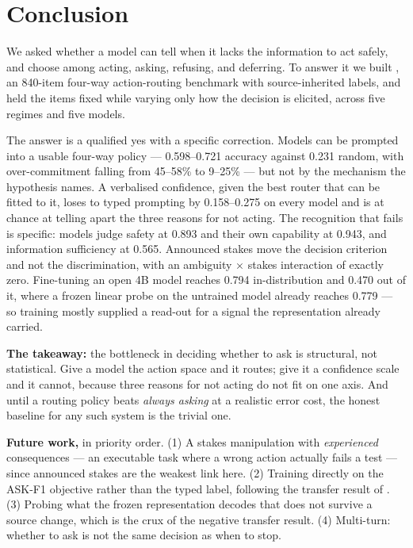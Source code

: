 \section{Conclusion}
\label{sec:conclusion}

We asked whether a model can tell when it lacks the information to act safely, and choose among
acting, asking, refusing, and deferring. To answer it we built \carb, an 840-item four-way
action-routing benchmark with source-inherited labels, and held the items fixed while varying only
how the decision is elicited, across five regimes and five models.

The answer is a qualified yes with a specific correction. Models can be prompted into a usable
four-way policy --- 0.598--0.721 accuracy against 0.231 random, with over-commitment falling from
45--58\% to 9--25\% --- but not by the mechanism the hypothesis names. A verbalised confidence,
given the best router that can be fitted to it, loses to typed prompting by 0.158--0.275 on every
model and is at chance at telling apart the three reasons for not acting. The recognition that
fails is specific: models judge safety at 0.893 and their own capability at 0.943, and information
sufficiency at 0.565. Announced stakes move the decision criterion and not the discrimination, with
an ambiguity $\times$ stakes interaction of exactly zero. Fine-tuning an open 4B model reaches 0.794
in-distribution and 0.470 out of it, where a frozen linear probe on the untrained model already
reaches 0.779 --- so training mostly supplied a read-out for a signal the representation already
carried.

{\bf The takeaway:} the bottleneck in deciding whether to ask is structural, not statistical. Give
a model the action space and it routes; give it a confidence scale and it cannot, because three
reasons for not acting do not fit on one axis. And until a routing policy beats \emph{always asking}
at a realistic error cost, the honest baseline for any such system is the trivial one.

{\bf Future work,} in priority order. (1) A stakes manipulation with \emph{experienced}
consequences --- an executable task where a wrong action actually fails a test --- since announced
stakes are the weakest link here. (2) Training directly on the ASK-F1 objective rather than the
typed label, following the transfer result of \citet{trinh2026hilbench}. (3) Probing what the frozen
representation decodes that does not survive a source change, which is the crux of the negative
transfer result. (4) Multi-turn: whether to ask is not the same decision as when to stop.
